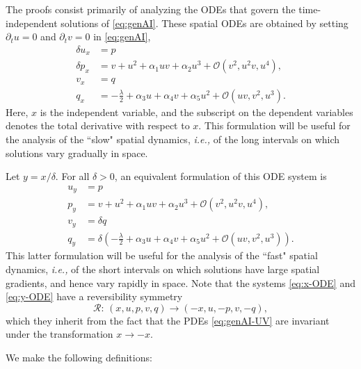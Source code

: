 \documentclass[11pt]{article}
\numberwithin{equation}{section}
\begin{document}
The proofs consist primarily of analyzing the ODEs that govern the time-independent solutions of \eqref{eq:genAI}.
These spatial ODEs are obtained by setting $\partial_t u=0$ and $\partial_t v=0$ in \eqref{eq:genAI},
\begin{equation}  \label{eq:x-ODE}
\begin{split}
    \delta u_x &= p \\
    \delta p_x &= v + u^2 + \alpha_1 uv + \alpha_2 u^3 + \mathcal{O}(v^2, u^2v, u^4),  \\
    v_x &= q \\
    q_x &= -\frac{\lambda}{2} + \alpha_3 u + \alpha_4 v + \alpha_5 u^2 + \mathcal{O}(uv,v^2,u^3).
\end{split}
\end{equation}
Here, $x$ is the independent variable, and the subscript on the dependent variables denotes the total derivative with respect to $x$.
This formulation will be useful for the analysis of the ``slow" spatial dynamics, 
{\it i.e.,} of the long intervals on which solutions vary gradually in space.

Let $y=x/\delta$.
For all $\delta>0$, an equivalent formulation of this ODE system is
\begin{equation}  \label{eq:y-ODE}
\begin{split}
    u_y &= p \\
    p_y &= v + u^2 + \alpha_1 uv + \alpha_2 u^3 + \mathcal{O}(v^2, u^2v, u^4),  \\
    v_y &= \delta q \\
    q_y &= \delta \left( -\frac{\lambda}{2} + \alpha_3 u + \alpha_4 v + \alpha_5 u^2 + \mathcal{O}(uv,v^2,u^3)\right).
\end{split}
\end{equation}
%
This latter formulation will be useful for the analysis of the ``fast" spatial dynamics, {\it i.e.,} of the short intervals on which solutions have large spatial gradients, and hence vary rapidly in space.
Note that the systems \eqref{eq:x-ODE} and \eqref{eq:y-ODE} have a reversibility symmetry 
\begin{equation}\label{eq:reversible}
{\mathcal R}: \, (x,u,p,v,q) \to (-x,u,-p,v,-q),
\end{equation}
which they inherit from the fact that the PDEs \eqref{eq:genAI-UV}
are invariant under the transformation $x \to -x$.

We make the following definitions: 
\end{document}
